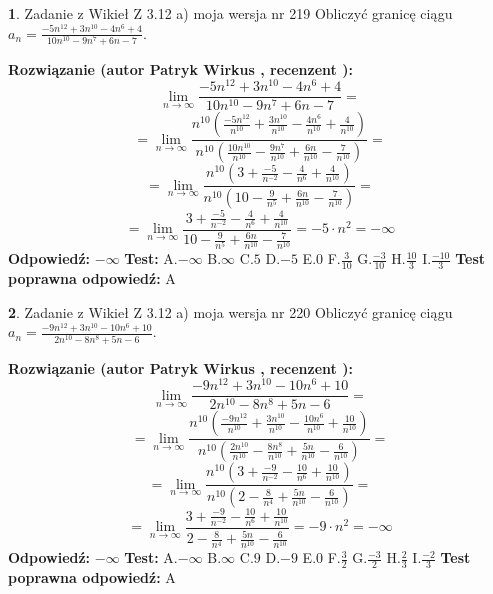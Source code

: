 \documentclass[12pt, a4paper]{article}
\theoremstyle{definition} %
\newtheorem{zad}{}
\newcommand{\zadStart}[1]{\begin{zad}#1\newline}
\newcommand{\zadStop}{\end{zad}}
\newcommand{\rozwStart}[2]{\noindent \textbf{Rozwiązanie (autor #1 , recenzent #2): }\newline}
\newcommand{\rozwStop}{\newline}
\newcommand{\odpStart}{\noindent \textbf{Odpowiedź:}\newline}
\newcommand{\odpStop}{\newline}
\newcommand{\testStart}{\noindent \textbf{Test:}\newline}
\newcommand{\testStop}{\newline}
\newcommand{\kluczStart}{\noindent \textbf{Test poprawna odpowiedź:}\newline}
\newcommand{\kluczStop}{\newline}
\begin{document}
\zadStart{Zadanie z Wikieł Z 3.12 a) moja wersja nr 219}
Obliczyć granicę ciągu $a_{n}=\frac{-5n^{12}+3n^{10}-4n^{6}+4}{10n^{10}-9n^{7}+6n-7}$.
\zadStop
\rozwStart{Patryk Wirkus}{}
$$\lim\limits_{n\to\infty}\frac{-5n^{12}+3n^{10}-4n^{6}+4}{10n^{10}-9n^{7}+6n-7}=$$
$$=\lim\limits_{n\to\infty}\frac{n^{10}\left(\frac{-5n^{12}}{n^{10}}+\frac{3n^{10}}{n^{10}}-\frac{4n^{6}}{n^{10}}+\frac{4}{n^{10}}\right)}{n^{10}\left(\frac{10n^{10}}{n^{10}}-\frac{9n^{7}}{n^{10}}+\frac{6n}{n^{10}}-\frac{7}{n^{10}}\right)}=$$
$$=\lim\limits_{n\to\infty}\frac{n^{10}\left(3+\frac{-5}{n^{-2}}-\frac{4}{n^{6}}+\frac{4}{n^{10}}\right)}
{n^{10}\left(10-\frac{9}{n^{5}}+\frac{6n}{n^{10}}-\frac{7}{n^{10}}\right)}=$$
$$=\lim\limits_{n\to\infty}\frac{3+\frac{-5}{n^{-2}}-\frac{4}{n^{6}}+\frac{4}{n^{10}}}{10-\frac{9}{n^{5}}+\frac{6n}{n^{10}}-\frac{7}{n^{10}}}=-5\cdot n^{2} = -\infty$$
\rozwStop
\odpStart
$-\infty$
\odpStop
\testStart
A.$-\infty$
B.$\infty$
C.$5$
D.$-5$
E.$0$
F.$\frac{3}{10}$
G.$\frac{-3}{10}$
H.$\frac{10}{3}$
I.$\frac{-10}{3}$
\testStop
\kluczStart
A
\kluczStop



\zadStart{Zadanie z Wikieł Z 3.12 a) moja wersja nr 220}
Obliczyć granicę ciągu $a_{n}=\frac{-9n^{12}+3n^{10}-10n^{6}+10}{2n^{10}-8n^{8}+5n-6}$.
\zadStop
\rozwStart{Patryk Wirkus}{}
$$\lim\limits_{n\to\infty}\frac{-9n^{12}+3n^{10}-10n^{6}+10}{2n^{10}-8n^{8}+5n-6}=$$
$$=\lim\limits_{n\to\infty}\frac{n^{10}\left(\frac{-9n^{12}}{n^{10}}+\frac{3n^{10}}{n^{10}}-\frac{10n^{6}}{n^{10}}+\frac{10}{n^{10}}\right)}{n^{10}\left(\frac{2n^{10}}{n^{10}}-\frac{8n^{8}}{n^{10}}+\frac{5n}{n^{10}}-\frac{6}{n^{10}}\right)}=$$
$$=\lim\limits_{n\to\infty}\frac{n^{10}\left(3+\frac{-9}{n^{-2}}-\frac{10}{n^{6}}+\frac{10}{n^{10}}\right)}
{n^{10}\left(2-\frac{8}{n^{4}}+\frac{5n}{n^{10}}-\frac{6}{n^{10}}\right)}=$$
$$=\lim\limits_{n\to\infty}\frac{3+\frac{-9}{n^{-2}}-\frac{10}{n^{6}}+\frac{10}{n^{10}}}{2-\frac{8}{n^{4}}+\frac{5n}{n^{10}}-\frac{6}{n^{10}}}=-9\cdot n^{2} = -\infty$$
\rozwStop
\odpStart
$-\infty$
\odpStop
\testStart
A.$-\infty$
B.$\infty$
C.$9$
D.$-9$
E.$0$
F.$\frac{3}{2}$
G.$\frac{-3}{2}$
H.$\frac{2}{3}$
I.$\frac{-2}{3}$
\testStop
\kluczStart
A
\kluczStop
\end{document}
